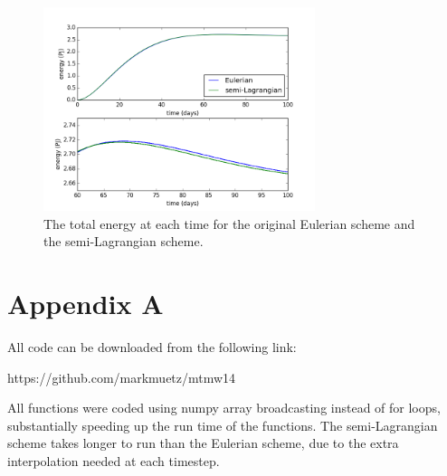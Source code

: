 \documentclass{article}
\begin{document}
\begin{figure}[ht!]
    \centering
    \includegraphics[width=300px]{figures/task_d_energy}
    \caption{The total energy at each time for the original Eulerian scheme and the semi-Lagrangian
    scheme.}
    \label{fig:task_d_energy}
\end{figure}

\printbibliography[title={References}]

\section*{Appendix A}

All code can be downloaded from the following link:

https://github.com/markmuetz/mtmw14

All functions were coded using numpy array broadcasting instead of for loops, substantially speeding
up the run time of the functions. The semi-Lagrangian scheme takes longer to run than the Eulerian
scheme, due to the extra interpolation needed at each timestep.
\end{document}
